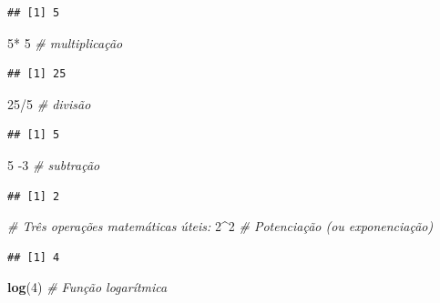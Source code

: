 \documentclass[]{book}
\newenvironment{Shaded}{\begin{snugshade}}{\end{snugshade}}
\newcommand{\KeywordTok}[1]{\textcolor[rgb]{0.13,0.29,0.53}{\textbf{{#1}}}}
\newcommand{\DecValTok}[1]{\textcolor[rgb]{0.00,0.00,0.81}{{#1}}}
\newcommand{\StringTok}[1]{\textcolor[rgb]{0.31,0.60,0.02}{{#1}}}
\newcommand{\CommentTok}[1]{\textcolor[rgb]{0.56,0.35,0.01}{\textit{{#1}}}}
\newcommand{\NormalTok}[1]{{#1}}
\begin{document}
\begin{verbatim}
## [1] 5
\end{verbatim}

\begin{Shaded}
\begin{Highlighting}[]
\DecValTok{5}\NormalTok{*}\StringTok{ }\DecValTok{5} \CommentTok{# multiplicação}
\end{Highlighting}
\end{Shaded}

\begin{verbatim}
## [1] 25
\end{verbatim}

\begin{Shaded}
\begin{Highlighting}[]
\DecValTok{25}\NormalTok{/}\DecValTok{5} \CommentTok{# divisão }
\end{Highlighting}
\end{Shaded}

\begin{verbatim}
## [1] 5
\end{verbatim}

\begin{Shaded}
\begin{Highlighting}[]
\DecValTok{5} \NormalTok{-}\DecValTok{3} \CommentTok{# subtração}
\end{Highlighting}
\end{Shaded}

\begin{verbatim}
## [1] 2
\end{verbatim}

\begin{Shaded}
\begin{Highlighting}[]
\CommentTok{# Três operações matemáticas úteis:}
\DecValTok{2}\NormalTok{^}\DecValTok{2}      \CommentTok{# Potenciação (ou exponenciação)}
\end{Highlighting}
\end{Shaded}

\begin{verbatim}
## [1] 4
\end{verbatim}

\begin{Shaded}
\begin{Highlighting}[]
\KeywordTok{log}\NormalTok{(}\DecValTok{4}\NormalTok{)   }\CommentTok{# Função logarítmica}
\end{Highlighting}
\end{Shaded}
\end{document}
